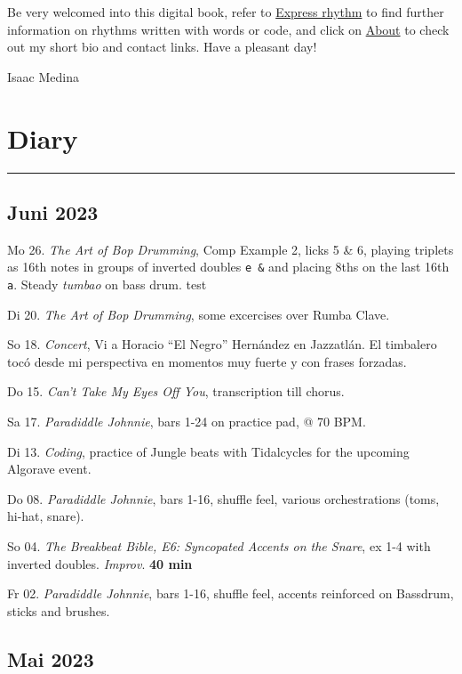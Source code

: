 \documentclass[
]{book}
\begin{document}
Be very welcomed into this digital book, refer to \protect\hyperlink{Express-rhythm}{Express rhythm} to find further information on rhythms written with words or code, and click on \protect\hyperlink{About}{About} to check out my short bio and contact links. Have a pleasant day!

Isaac Medina

\hypertarget{Diary}{%
\chapter{Diary}\label{Diary}}

\begin{center}\rule{0.5\linewidth}{0.5pt}\end{center}

\hypertarget{juni-2023}{%
\section*{Juni 2023}\label{juni-2023}}

Mo 26. \emph{The Art of Bop Drumming}, Comp Example 2, licks 5 \& 6, playing triplets as 16th notes in groups of inverted doubles \texttt{e\ \&} and placing 8ths on the last 16th \texttt{a}. Steady \emph{tumbao} on bass drum. test

\hypertarget{jun262023}{}

Di 20. \emph{The Art of Bop Drumming}, some excercises over Rumba Clave.

So 18. \emph{Concert}, Vi a Horacio ``El Negro'' Hernández en Jazzatlán. El timbalero tocó desde mi perspectiva en momentos muy fuerte y con frases forzadas.

Do 15. \emph{Can't Take My Eyes Off You}, transcription till chorus.

Sa 17. \emph{Paradiddle Johnnie}, bars 1-24 on practice pad, @ 70 BPM.

Di 13. \emph{Coding}, practice of Jungle beats with Tidalcycles for the upcoming Algorave event.

Do 08. \emph{Paradiddle Johnnie}, bars 1-16, shuffle feel, various orchestrations (toms, hi-hat, snare).

So 04. \emph{The Breakbeat Bible, E6: Syncopated Accents on the Snare}, ex 1-4 with inverted doubles. \emph{Improv}. \textbf{40 min}

Fr 02. \emph{Paradiddle Johnnie}, bars 1-16, shuffle feel, accents reinforced on Bassdrum, sticks and brushes.

\hypertarget{mai-2023}{%
\section*{Mai 2023}\label{mai-2023}}
\end{document}
